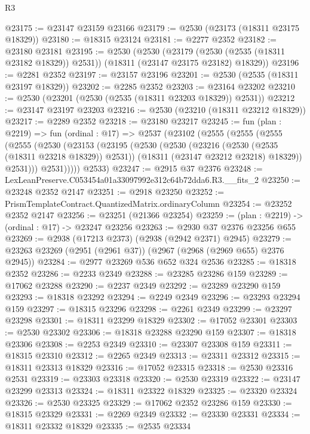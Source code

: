\begin{lexlean}{R3}
\begin{coremodule}
@23175 := @23147 @23159 @23166
@23179 := @2530 (@23173 (@18311 @23175 @18329))
@23180 := @18315 @23124
@23181 := @2277 @2352
@23182 := @23180 @23181
@23195 := @2530
    (@2530
      (@23179 (@2530 (@2535 (@18311 @23182 @18329)) @2531))
      (@18311 (@23147 @23175 @23182) @18329))
@23196 := @2281 @2352
@23197 := @23157 @23196
@23201 := @2530 (@2535 (@18311 @23197 @18329))
@23202 := @2285 @2352
@23203 := @23164 @23202
@23210 := @2530 (@23201 (@2530 (@2535 (@18311 @23203 @18329)) @2531))
@23212 := @23147 @23197 @23203
@23216 := @2530 (@23210 (@18311 @23212 @18329))
@23217 := @2289 @2352
@23218 := @23180 @23217
@23245 := fun (plan : @2219) =>
  fun (ordinal : @17) =>
  @2537
    (@23102
      (@2555
        (@2555
          (@2555
            (@2555
              (@2530
                (@23153
                  (@23195
                    (@2530
                      (@2530
                        (@23216 (@2530 (@2535 (@18311 @23218 @18329)) @2531))
                        (@18311 (@23147 @23212 @23218) @18329))
                      @2531)))
                @2531)))))
      @2533)
@23247 := @2915 @37 @2376
@23248 := LexLeanPreserve.C053454a01a33097992e312c64b72dda6.R3.__fits_2
@23250 := @23248 @2352 @2147
@23251 := @2918 @23250
@23252 := PrismTemplateContract.QuantizedMatrix.ordinaryColumn
@23254 := @23252 @2352 @2147
@23256 := @23251 (@21366 @23254)
@23259 := (plan : @2219) -> (ordinal : @17) -> @23247 @23256
@23263 := @2930 @37 @2376 @23256 @655
@23269 := @2938 (@17213 @2373) (@2938 (@2942 @2371) @2945)
@23279 := @23263 @23269 (@2951 (@2961 @37)) (@2967 (@2968 (@2969 @655) @2376 @2945))
@23284 := @2977 @23269 @536 @652 @324 @2536
@23285 := @18318 @2352
@23286 := @2233 @2349
@23288 := @23285 @23286 @159
@23289 := @17062 @23288
@23290 := @2237 @2349
@23292 := @23289 @23290 @159
@23293 := @18318 @23292
@23294 := @2249 @2349
@23296 := @23293 @23294 @159
@23297 := @18315 @23296
@23298 := @2261 @2349
@23299 := @23297 @23298
@23301 := @18311 @23299 @18329
@23302 := @17052 @23301
@23303 := @2530 @23302
@23306 := @18318 @23288 @23290 @159
@23307 := @18318 @23306
@23308 := @2253 @2349
@23310 := @23307 @23308 @159
@23311 := @18315 @23310
@23312 := @2265 @2349
@23313 := @23311 @23312
@23315 := @18311 @23313 @18329
@23316 := @17052 @23315
@23318 := @2530 @23316 @2531
@23319 := @23303 @23318
@23320 := @2530 @23319
@23322 := @23147 @23299 @23313
@23324 := @18311 @23322 @18329
@23325 := @23320 @23324
@23326 := @2530 @23325
@23329 := @17062 @2352 @23286 @159
@23330 := @18315 @23329
@23331 := @2269 @2349
@23332 := @23330 @23331
@23334 := @18311 @23332 @18329
@23335 := @2535 @23334

\end{coremodule}
\end{lexlean}
